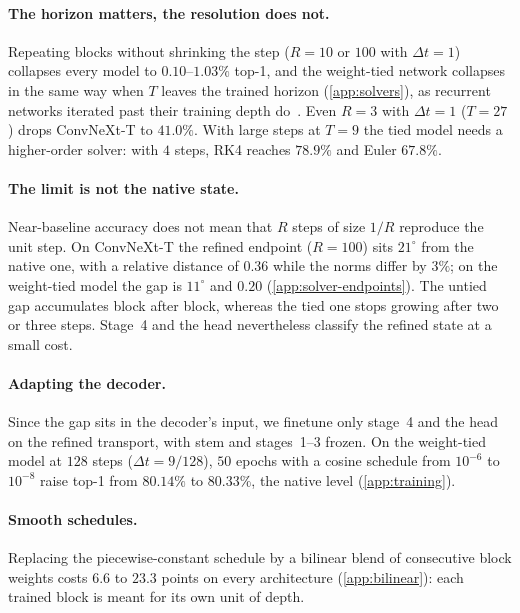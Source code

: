 \paragraph{The horizon matters, the resolution does not.}
Repeating blocks without shrinking the step ($R{=}10$ or $100$ with $\Delta t{=}1$)
collapses every model to $0.10$--$1.03\%$ top-1, and the weight-tied network collapses
in the same way when $T$ leaves the trained horizon (\cref{app:solvers}), as recurrent
networks iterated past their training depth do~\citep{bansal2022endtoend}.
Even $R{=}3$ with $\Delta t{=}1$ ($T{=}27$) drops ConvNeXt-T to $41.0\%$.
With large steps at $T{=}9$ the tied model needs a higher-order solver: with $4$
steps, RK4 reaches $78.9\%$ and Euler $67.8\%$.

\paragraph{The limit is not the native state.}
Near-baseline accuracy does not mean that $R$ steps of size $1/R$ reproduce the unit
step.
On ConvNeXt-T the refined endpoint ($R{=}100$) sits $21^\circ$ from the native one,
with a relative distance of $0.36$ while the norms differ by $3\%$; on the weight-tied
model the gap is $11^\circ$ and $0.20$ (\cref{app:solver-endpoints}).
The untied gap accumulates block after block, whereas the tied one stops growing after
two or three steps.
Stage~4 and the head nevertheless classify the refined state at a small cost.

\paragraph{Adapting the decoder.}
Since the gap sits in the decoder's input, we finetune only stage~4 and the head on
the refined transport, with stem and stages~1--3 frozen.
On the weight-tied model at $128$ steps ($\Delta t{=}9/128$), $50$ epochs with a cosine
schedule from $10^{-6}$ to $10^{-8}$ raise top-1 from $80.14\%$ to $80.33\%$, the
native level (\cref{app:training}).

\paragraph{Smooth schedules.}
Replacing the piecewise-constant schedule by a bilinear blend of consecutive block
weights costs $6.6$ to $23.3$ points on every architecture (\cref{app:bilinear}): each
trained block is meant for its own unit of depth.
